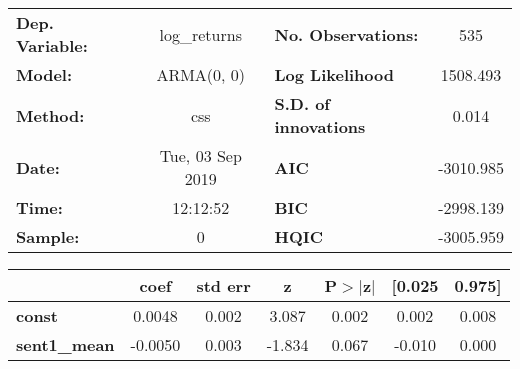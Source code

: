 \begin{center}
\begin{tabular}{lclc}
\toprule
\textbf{Dep. Variable:} &   log\_returns   & \textbf{  No. Observations:  } &    535      \\
\textbf{Model:}         &    ARMA(0, 0)    & \textbf{  Log Likelihood     } &  1508.493   \\
\textbf{Method:}        &       css        & \textbf{  S.D. of innovations} &   0.014     \\
\textbf{Date:}          & Tue, 03 Sep 2019 & \textbf{  AIC                } & -3010.985   \\
\textbf{Time:}          &     12:12:52     & \textbf{  BIC                } & -2998.139   \\
\textbf{Sample:}        &        0         & \textbf{  HQIC               } & -3005.959   \\
\bottomrule
\end{tabular}
\begin{tabular}{lcccccc}
                     & \textbf{coef} & \textbf{std err} & \textbf{z} & \textbf{P$> |$z$|$} & \textbf{[0.025} & \textbf{0.975]}  \\
\midrule
\textbf{const}       &       0.0048  &        0.002     &     3.087  &         0.002        &        0.002    &        0.008     \\
\textbf{sent1\_mean} &      -0.0050  &        0.003     &    -1.834  &         0.067        &       -0.010    &        0.000     \\
\bottomrule
\end{tabular}
\end{center}
